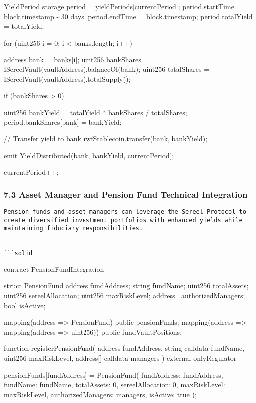 \documentclass[12pt]{article}
\begin{document}
{{{        YieldPeriod storage period = yieldPeriods[currentPeriod];        period.startTime = block.timestamp - 30 days;        period.endTime = block.timestamp;        period.totalYield = totalYield;

        for (uint256 i = 0; i < banks.length; i++) {            address bank = banks[i];            uint256 bankShares = ISereelVault(vaultAddress).balanceOf(bank);            uint256 totalShares = ISereelVault(vaultAddress).totalSupply();

            if (bankShares > 0) {                uint256 bankYield = totalYield * bankShares / totalShares;                period.bankShares[bank] = bankYield;

                // Transfer yield to bank                rwfStablecoin.transfer(bank, bankYield);

                emit YieldDistributed(bank, bankYield, currentPeriod);            }        }

        currentPeriod++;    }}
\subsubsection{7.3 Asset Manager and Pension Fund Technical Integration} %

\begin{lstlisting}
Pension funds and asset managers can leverage the Sereel Protocol to create diversified investment portfolios with enhanced yields while maintaining fiduciary responsibilities.


```solid
\end{lstlisting}
contract PensionFundIntegration {    struct PensionFund {        address fundAddress;        string fundName;        uint256 totalAssets;        uint256 sereelAllocation;        uint256 maxRiskLevel;        address[] authorizedManagers;        bool isActive;    }

    mapping(address => PensionFund) public pensionFunds;    mapping(address => mapping(address => uint256)) public fundVaultPositions;

    function registerPensionFund(        address fundAddress,        string calldata fundName,        uint256 maxRiskLevel,        address[] calldata managers    ) external onlyRegulator {        pensionFunds[fundAddress] = PensionFund({            fundAddress: fundAddress,            fundName: fundName,            totalAssets: 0,            sereelAllocation: 0,            maxRiskLevel: maxRiskLevel,            authorizedManagers: managers,            isActive: true        });

}}}
\end{document}
